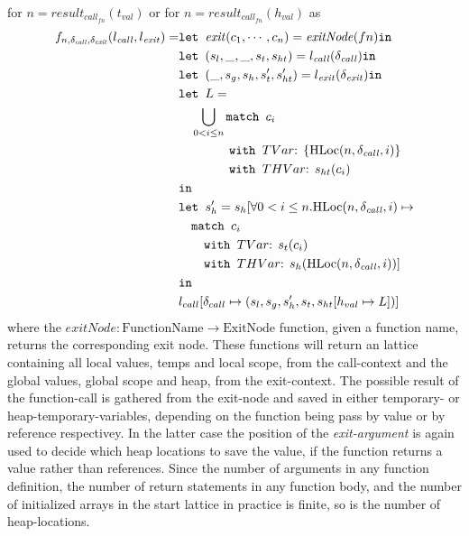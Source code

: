 for $n = \mathit{result}_{\mathit{call}_{fn}}(t_{val})$ or for $n = \mathit{result}_{\mathit{call}_{fn}}(h_{val})$ as 
\begin{align}
f_{n,\delta_{\mathit{call}}, \delta_{\mathit{exit}}}(l_{\mathit{call}}, l_{\mathit{exit}})=   &\texttt{let } \mathit{exit}(c_1, \cdots, c_n) = \mathit{exitNode}(fn) \texttt{in }\notag\\
                                                &\texttt{let } (s_l, \_, \_, s_t, s_{ht}) = l_{\mathit{call}}(\delta_{\mathit{call}}) \texttt{in }\notag\\
                                                &\texttt{let } (\_, s_g, s_h, s_t', s_{ht}') = l_{\mathit{exit}}(\delta_{\mathit{exit}}) \texttt{in }\notag\\
                                                &\texttt{let } L = \notag\\
                                                &\quad \bigcup_{0<i \leq n} \texttt{match }c_i\notag\\
                                                &\quad\quad\quad\quad \texttt{with }TVar\text{: } \{\text{HLoc}(n,\delta_{\mathit{call}}, i)\}\notag\\
                                                &\quad\quad\quad\quad \texttt{with }THVar\text{: } s_{ht}(c_i)\notag\\
                                                & \texttt{in }\notag\\
                                                &\texttt{let } s_h' = s_h[\forall 0 < i \leq n. \text{HLoc}(n,\delta_{\mathit{call}}, i) \mapsto\notag\\
                                                &\quad\texttt{match }c_i\notag\\
                                                &\quad\quad \texttt{with }TVar\text{: } s_t(c_i)\notag\\
                                                &\quad\quad \texttt{with }THVar\text{: } s_h(\text{HLoc}(n,\delta_{\mathit{call}}, i))]\notag\\
                                                & \texttt{in }\notag\\
                                                &l_{call}[\delta_{call}\mapsto (s_l,s_g,s_h', s_t, s_{ht}[h_{val}\mapsto L])]
\end{align}
where the $\mathit{exitNode} : \text{FunctionName} \rightarrow \text{ExitNode}$ function, given a function name, returns the corresponding exit node. These functions will return an lattice containing all local values, temps and local scope, from the call-context and the global values, global scope and heap, from the exit-context. The possible result of the function-call is gathered from the exit-node and saved in either temporary- or heap-temporary-variables, depending on the function being pass by value or by reference respectivey. In the latter case the position of the \emph{exit-argument} is again used to decide which heap locations to save the value, if the function returns a value rather than references. Since the number of arguments  in any function definition, the number of return statements in any function body, and the number of initialized arrays in the start lattice in practice is finite, so is the number of heap-locations. 
